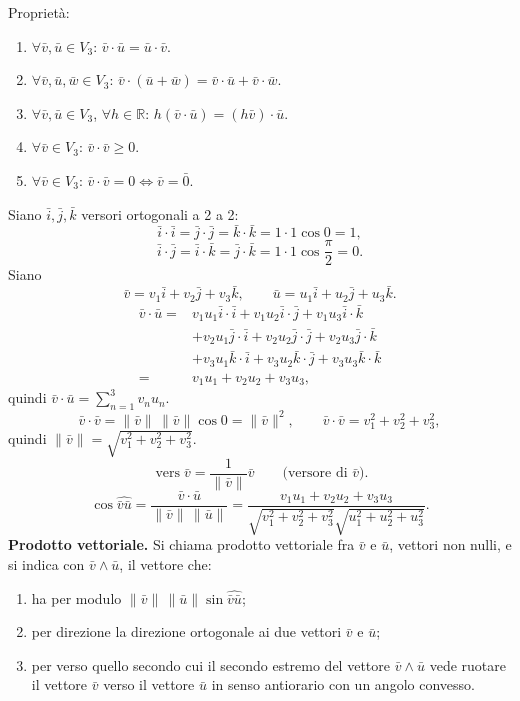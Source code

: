\documentclass[11pt,a4paper]{article}
\newcommand{\pagina}[1]{\clearpage}
\begin{document}
\pagina{48}
Proprietà:
\begin{enumerate}
\item $\forall\bar v,\bar u\in V_3$: $\bar v\cdot\bar u=\bar u\cdot\bar v$.
\item $\forall\bar v,\bar u,\bar w\in V_3$: $\bar v\cdot(\bar u+\bar w)=\bar v\cdot\bar u+\bar v\cdot\bar w$.
\item $\forall\bar v,\bar u\in V_3$, $\forall h\in\mathbb R$: $h(\bar v\cdot\bar u)=(h\bar v)\cdot\bar u$.
\item $\forall\bar v\in V_3$: $\bar v\cdot\bar v\ge0$.
\item $\forall\bar v\in V_3$: $\bar v\cdot\bar v=0\Longleftrightarrow\bar v=\bar0$.
\end{enumerate}
Siano $\bar i,\bar j,\bar k$ versori ortogonali a 2 a 2:
\[\bar i\cdot\bar i=\bar j\cdot\bar j=\bar k\cdot\bar k=1\cdot1\cos0=1,\]
\[\bar i\cdot\bar j=\bar i\cdot\bar k=\bar j\cdot\bar k=1\cdot1\cos\frac\pi2=0.\]
Siano
\[\bar v=v_1\bar i+v_2\bar j+v_3\bar k,\qquad\bar u=u_1\bar i+u_2\bar j+u_3\bar k.\]
\[\begin{aligned}
\bar v\cdot\bar u={}&v_1u_1\bar i\cdot\bar i+v_1u_2\bar i\cdot\bar j+v_1u_3\bar i\cdot\bar k\\
&+v_2u_1\bar j\cdot\bar i+v_2u_2\bar j\cdot\bar j+v_2u_3\bar j\cdot\bar k\\
&+v_3u_1\bar k\cdot\bar i+v_3u_2\bar k\cdot\bar j+v_3u_3\bar k\cdot\bar k\\
={}&v_1u_1+v_2u_2+v_3u_3,
\end{aligned}\]
quindi $\displaystyle\bar v\cdot\bar u=\sum_{n=1}^3v_nu_n$.
\[\bar v\cdot\bar v=\|\bar v\|\,\|\bar v\|\cos0=\|\bar v\|^2,\qquad \bar v\cdot\bar v=v_1^2+v_2^2+v_3^2,\]
quindi $\|\bar v\|=\sqrt{v_1^2+v_2^2+v_3^2}$.
\[\operatorname{vers}\bar v=\frac1{\|\bar v\|}\bar v\qquad\text{(versore di }\bar v\text{)}.\]
\pagina{49}
\[\cos\widehat{\bar v\bar u}=\frac{\bar v\cdot\bar u}{\|\bar v\|\,\|\bar u\|}
=\frac{v_1u_1+v_2u_2+v_3u_3}{\sqrt{v_1^2+v_2^2+v_3^2}\sqrt{u_1^2+u_2^2+u_3^2}}.\]
\textbf{Prodotto vettoriale.} Si chiama prodotto vettoriale fra $\bar v$ e $\bar u$, vettori non nulli, e si indica con $\bar v\wedge\bar u$, il vettore che:
\begin{enumerate}\item ha per modulo $\|\bar v\|\,\|\bar u\|\sin\widehat{\bar v\bar u}$;
\item per direzione la direzione ortogonale ai due vettori $\bar v$ e $\bar u$;
\item per verso quello secondo cui il secondo estremo del vettore $\bar v\wedge\bar u$ vede ruotare il vettore $\bar v$ verso il vettore $\bar u$ in senso antiorario con un angolo convesso.\end{enumerate}
\end{document}
